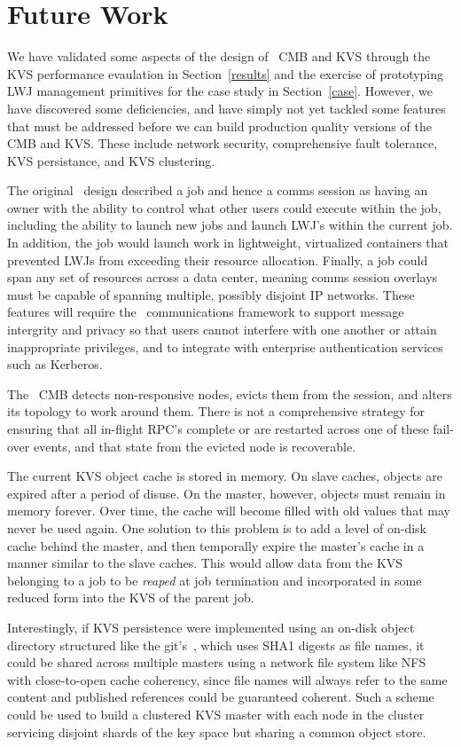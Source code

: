 \section{Future Work}

We have validated some aspects of the design of \flux\ CMB and KVS
through the KVS performance evaulation in Section~\ref{results}
and the exercise of prototyping LWJ management primitives for the
case study in Section~\ref{case}.  However, we have discovered some
deficiencies, and have simply not yet tackled some features
that must be addressed before we can build production
quality versions of the CMB and KVS.
These include network security, comprehensive fault tolerance,
KVS persistance, and KVS clustering.

The original \flux\ design described a job and hence a comms session
as having an owner with the ability to control what other users could
execute within the job, including the ability to launch new jobs and
launch LWJ's within the current job.  In addition, the job would launch
work in lightweight, virtualized containers that prevented LWJs from
exceeding their resource allocation.  Finally, a job could span any set
of resources across a data center, meaning comms session overlays must
be capable of spanning multiple, possibly disjoint IP networks.
These features will require the \flux\ communications framework to
support message intergrity and privacy so that users cannot interfere
with one another or attain inappropriate privileges, and to integrate with
enterprise authentication services such as Kerberos.

The \flux\ CMB detects non-responsive nodes, evicts them from
the session, and alters its topology to work around them.
There is not a comprehensive strategy for ensuring that all in-flight
RPC's complete or are restarted across one of these fail-over events,
and that state from the evicted node is recoverable.

The current KVS object cache is stored in memory.
On slave caches, objects are expired after a period of disuse.
On the master, however, objects must remain in memory forever.
Over time, the cache will become filled with old values that may never
be used again.  One solution to this problem is to add a level of
on-disk cache behind the master, and then temporally expire the master's
cache in a manner similar to the slave caches.  This would allow data from
the KVS belonging to a job to be {\em reaped} at job termination and
incorporated in some reduced form into the KVS of the parent job.

Interestingly, if KVS persistence were implemented using an on-disk
object directory structured like the git's~\cite{Chacon:2009:PG:1618548},
which uses SHA1 digests as file names, it could be shared across multiple
masters using a network file system like NFS with close-to-open cache
coherency, since file names will always refer to the same content and
published references could be guaranteed coherent.
Such a scheme could be used to build a clustered KVS master with each
node in the cluster servicing disjoint shards of the key space but
sharing a common object store.
